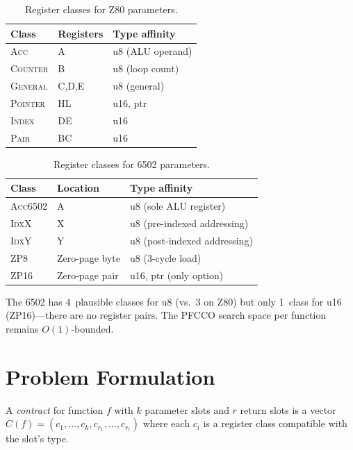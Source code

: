 \documentclass[sigplan,screen,nonacm]{acmart}
\begin{document}
\begin{table}[h]
\centering\small
\caption{Register classes for Z80 parameters.}
\label{tab:classes}
\begin{tabular}{@{}lll@{}}
\toprule
Class & Registers & Type affinity \\
\midrule
\textsc{Acc}     & A       & u8 (ALU operand) \\
\textsc{Counter} & B       & u8 (loop count) \\
\textsc{General} & C,D,E   & u8 (general) \\
\textsc{Pointer} & HL      & u16, ptr \\
\textsc{Index}   & DE      & u16 \\
\textsc{Pair}    & BC      & u16 \\
\bottomrule
\end{tabular}
\end{table}

\begin{table}[h]
\centering\small
\caption{Register classes for 6502 parameters.}
\label{tab:6502classes}
\begin{tabular}{@{}lll@{}}
\toprule
Class & Location & Type affinity \\
\midrule
\textsc{Acc6502}  & A              & u8 (sole ALU register) \\
\textsc{IdxX}     & X              & u8 (pre-indexed addressing) \\
\textsc{IdxY}     & Y              & u8 (post-indexed addressing) \\
\textsc{ZP8}      & Zero-page byte & u8 (3-cycle load) \\
\textsc{ZP16}     & Zero-page pair & u16, ptr (only option) \\
\bottomrule
\end{tabular}
\end{table}

\noindent The 6502 has 4~plausible classes for u8 (vs.\ 3 on Z80) but only
1~class for u16 (\textsc{ZP16})---there are no register pairs.  The PFCCO
search space per function remains $O(1)$-bounded.

\section{Problem Formulation}
\label{sec:formulation}

\begin{definition}[Contract]
A \emph{contract} for function $f$ with $k$ parameter slots and $r$ return
slots is a vector $C(f) = (c_1, \ldots, c_k, c_{r_1}, \ldots, c_{r_r})$
where each $c_i$ is a register class compatible with the slot's type.
\end{definition}
\end{document}
